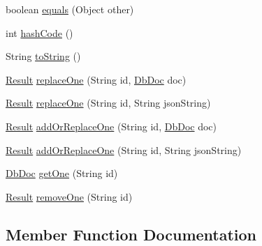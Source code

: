 \begin{DoxyCompactItemize}
\item 
boolean \mbox{\hyperlink{classcom_1_1mysql_1_1cj_1_1xdevapi_1_1_collection_impl_a22e3fb90ebe5884021a7777f508ecac1}{equals}} (Object other)
\item 
int \mbox{\hyperlink{classcom_1_1mysql_1_1cj_1_1xdevapi_1_1_collection_impl_a08656f99ce317ea44f8c77a3aca71238}{hash\+Code}} ()
\item 
String \mbox{\hyperlink{classcom_1_1mysql_1_1cj_1_1xdevapi_1_1_collection_impl_ab585b5f987e9f5be94a9f0e5fd46e8dc}{to\+String}} ()
\item 
\mbox{\hyperlink{interfacecom_1_1mysql_1_1cj_1_1xdevapi_1_1_result}{Result}} \mbox{\hyperlink{classcom_1_1mysql_1_1cj_1_1xdevapi_1_1_collection_impl_a1e0434f441bd0711cc5799c5bf7d7eb9}{replace\+One}} (String id, \mbox{\hyperlink{interfacecom_1_1mysql_1_1cj_1_1xdevapi_1_1_db_doc}{Db\+Doc}} doc)
\item 
\mbox{\hyperlink{interfacecom_1_1mysql_1_1cj_1_1xdevapi_1_1_result}{Result}} \mbox{\hyperlink{classcom_1_1mysql_1_1cj_1_1xdevapi_1_1_collection_impl_a42447696000df5bed9553ec3e6b90b23}{replace\+One}} (String id, String json\+String)
\item 
\mbox{\hyperlink{interfacecom_1_1mysql_1_1cj_1_1xdevapi_1_1_result}{Result}} \mbox{\hyperlink{classcom_1_1mysql_1_1cj_1_1xdevapi_1_1_collection_impl_ad1e0f8f347e30a720c5a58b9a1eb0e41}{add\+Or\+Replace\+One}} (String id, \mbox{\hyperlink{interfacecom_1_1mysql_1_1cj_1_1xdevapi_1_1_db_doc}{Db\+Doc}} doc)
\item 
\mbox{\hyperlink{interfacecom_1_1mysql_1_1cj_1_1xdevapi_1_1_result}{Result}} \mbox{\hyperlink{classcom_1_1mysql_1_1cj_1_1xdevapi_1_1_collection_impl_a8e247d56dcbdf5d34c86b48f23a411a9}{add\+Or\+Replace\+One}} (String id, String json\+String)
\item 
\mbox{\hyperlink{interfacecom_1_1mysql_1_1cj_1_1xdevapi_1_1_db_doc}{Db\+Doc}} \mbox{\hyperlink{classcom_1_1mysql_1_1cj_1_1xdevapi_1_1_collection_impl_a695292bee01bb76999afa4fa2629537b}{get\+One}} (String id)
\item 
\mbox{\hyperlink{interfacecom_1_1mysql_1_1cj_1_1xdevapi_1_1_result}{Result}} \mbox{\hyperlink{classcom_1_1mysql_1_1cj_1_1xdevapi_1_1_collection_impl_ad00c7702e15cc50b051636f957b8cd6e}{remove\+One}} (String id)
\end{DoxyCompactItemize}


\subsection{Member Function Documentation}
\mbox{\label{classcom_1_1mysql_1_1cj_1_1xdevapi_1_1_collection_impl_a66d3e972cdbc3ab751a4ebbca12ca57e}} 
